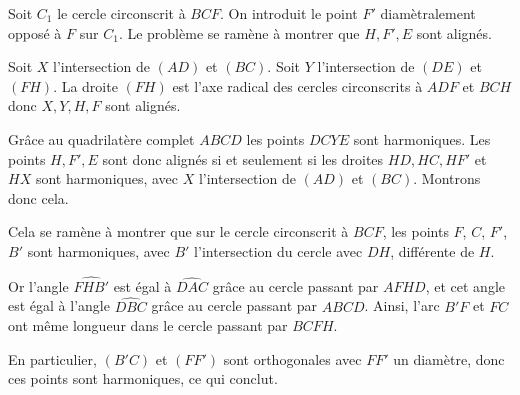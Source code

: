 \begin{sol}
Soit $C_1$ le cercle circonscrit à $BCF$. On introduit le point $F'$ diamètralement opposé à $F$ sur $C_1$. Le problème se ramène à montrer que $H,F',E$ sont alignés.

\medskip

Soit $X$ l'intersection de $(AD)$ et $(BC)$. Soit $Y$ l'intersection de $(DE)$ et $(FH)$. La droite $(FH)$ est l'axe radical des cercles circonscrits à $ADF$ et $BCH$ donc $X,Y,H,F$ sont alignés.

Grâce au quadrilatère complet $ABCD$ les points $DCYE$ sont harmoniques. Les points $H,F',E$ sont donc alignés si et seulement si les droites $HD,HC,HF'$ et $HX$ sont harmoniques, avec $X$ l'intersection de $(AD)$ et $(BC)$. Montrons donc cela.

\medskip

Cela se ramène à montrer que sur le cercle circonscrit à $BCF$, les points $F$, $C$, $F'$, $B'$ sont harmoniques, avec $B'$ l'intersection du cercle avec $DH$, différente de $H$.

Or l'angle $\widehat{FHB'}$ est égal à $\widehat{DAC}$ grâce au cercle passant par $AFHD$, et cet angle est égal à l'angle $\widehat{DBC}$ grâce au cercle passant par $ABCD$. Ainsi, l'arc $B'F$ et $FC$ ont même longueur dans le cercle passant par $BCFH$.

En particulier, $(B'C)$ et $(FF')$ sont orthogonales avec $FF'$ un diamètre, donc ces points sont harmoniques, ce qui conclut.


\end{sol}
